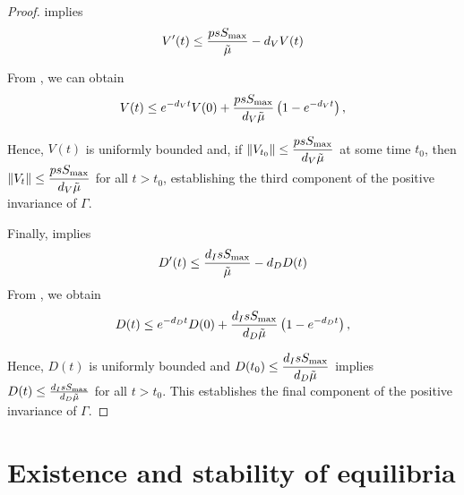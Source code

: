 \documentclass{CMHPhD-SIVD}
\begin{document}
\begin{proof}
 implies
\begin{eqnarray}\label{39}
V'(t)\leq \frac{ps S_{\text{max}}}{\tilde{\mu}}-d_V V(t)
\end{eqnarray}

From , we can obtain
\begin{align*}
V(t)\leq e^{-d_V t}V(0)+\frac{p s S_{\text{max}}}{d_V\tilde{\mu}}\left(1-e^{-d_V t}\right),
\end{align*}

Hence, $V(t)$ is uniformly bounded and, if $\|V_{t_0}\| \leq \dfrac{ p s S_{\text{max}}}{d_V\tilde{\mu}}$ at some time ${t_0}$,  then $\|V_t\| \leq \dfrac{ p s S_{\text{max}}}{d_V\tilde{\mu}}$ for all $t>t_0$, establishing the third component of the positive invariance of $\Gamma$.



Finally,  implies
\begin{eqnarray}\label{40}
D'(t)\leq  \dfrac{d_I s S_{\text{max}}}{\tilde{\mu}}-d_D D(t)
\end{eqnarray}
From , we obtain
\begin{align*}
D(t)\leq e^{-d_D t}D(0)+\dfrac{d_I s S_{\text{max}}}{d_D\tilde{\mu}}\left(1-e^{-d_D t}\right),
\end{align*}

Hence, $D(t)$ is uniformly bounded and $D(t_0)\leq \dfrac{ d_I s S_{\text{max}}}{d_D\tilde{\mu}}$ implies $D(t)\leq \frac{d_I s S_{\text{max}}}{d_D\tilde{\mu}}$ for all $t>t_0$. This establishes the final component of the positive invariance of $\Gamma$.


\end{proof}

\section{Existence and stability of equilibria}
\end{document}
